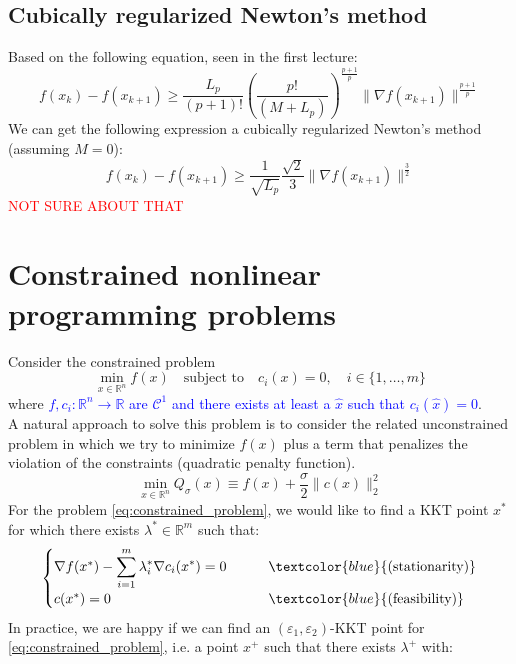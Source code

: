 \documentclass[12pt, openany]{report}
\newcommand{\R}{\mathbb{R}}
\newcommand{\C}{\mathcal{C}}
\theoremstyle{definition}
\begin{document}
\section{Cubically regularized Newton's method}
Based on the following equation, seen in the first lecture:
\begin{equation}
	f(x_k) - f(x_{k+1}) \geq \frac{L_p}{(p+1)!} \left(\frac{p!}{(M+L_p)}\right)^{\frac{p+1}{p}} \|\nabla f(x_{k+1})\|^{\frac{p+1}{p}}
\end{equation}
We can get the following expression a cubically regularized Newton's method (assuming $M=0$):
\begin{equation}
	f(x_k) - f(x_{k+1}) \geq \frac{1}{\sqrt{L_p}} \frac{\sqrt{2}}{3} \|\nabla f(x_{k+1})\|^{\frac{3}{2}}
\end{equation}
\textcolor{red}{NOT SURE ABOUT THAT}
\chapter{Constrained nonlinear programming problems}
Consider the constrained problem 
\begin{equation}\label{eq:constrained_problem}
	\min_{x \in \R^n} f(x) \quad \text{subject to} \quad c_i(x) = 0, \quad i \in \{1,\dots,m\}	
\end{equation}
where \textcolor{blue}{$f,c_i : \R^n \to \R$ are $\C^1$ and there exists at least a $\hat{x}$ such that $c_i(\hat{x}) = 0$}.\\
A natural approach to solve this problem is to consider the related unconstrained problem in which we try to minimize $f(x)$ plus a term that penalizes the violation of the constraints (quadratic penalty function).
\begin{equation}\label{eq:penalty_function}
	\min_{x \in \R^n} Q_{\sigma} (x) \equiv f(x) + \frac{\sigma}{2} \|c(x)\|_2^2
\end{equation}
For the problem \eqref{eq:constrained_problem}, we would like to find a KKT point $x^*$ for which there exists $\lambda^* \in \R^m$ such that:
\begin{equation}\label{eq:KKT}
	\begin{cases}
		\nabla f(x^*) - \displaystyle \sum_{i=1}^m \lambda_i^* \nabla c_i(x^*) = 0  \quad \quad &\textcolor{blue}{\text{(stationarity)}}\\
		c(x^*) = 0 &\textcolor{blue}{\text{(feasibility)}}
	\end{cases}
\end{equation}
In practice, we are happy if we can find an $(\varepsilon_1,\varepsilon_2)$-KKT point for \eqref{eq:constrained_problem}, i.e. a point $x^+$ such that there exists $\lambda^+$ with:
\end{document}
